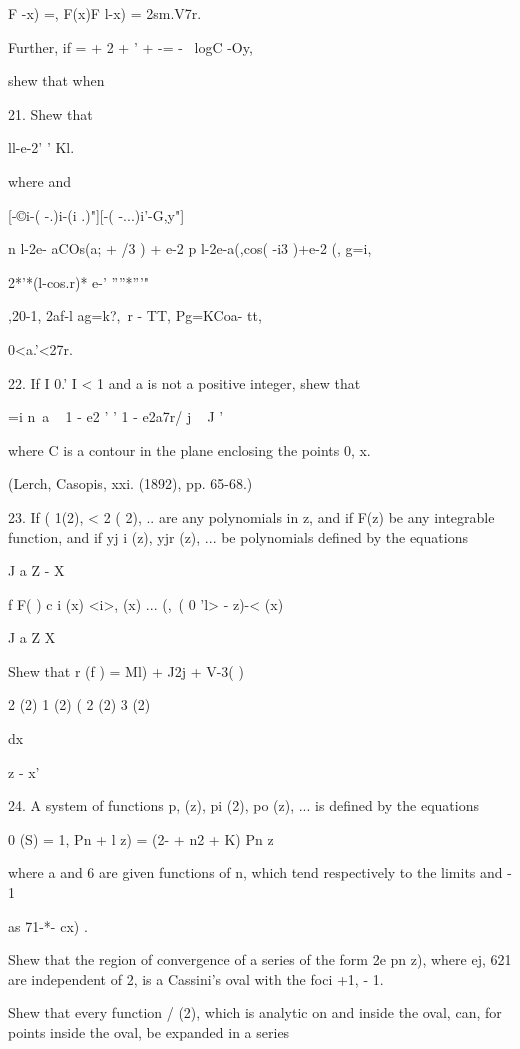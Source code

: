 {{{F -x) =, F(x)F l-x) = 2sm.V7r.

Further, if = + 2 + ' + -= - \ logC -Oy,

shew that when

21. Shew that

ll-e-2' ' Kl.


where and

[-©i-( -.)i-(i .)"][-( -...)i'-G,y"]

n l-2e- aCOs(a; + /3 ) + e-2 p l-2e-a(,cos( -i3 )+e-2 (, g=i,

2*'*(l-cos.r)* e-' ''''*'''"

,20-1, 2af-l ag=k?,\ r - TT, Pg=KCoa- tt,

0<a.'<27r.


%
%

22. If I 0.' I < 1 and a is not a positive integer, shew that

 =i n~a ~ 1 - e2 ' ' 1 - e2a7r/ j ~ J '

where C is a contour in the plane enclosing the points 0, x.

(Lerch, Casopis, xxi. (1892), pp. 65-68.)

23. If ( 1(2), < 2 ( 2), .. are any polynomials in z, and if F(z) be
any integrable function, and if yj i (z), yjr (z), ... be polynomials
defined by the equations

J a Z - X

f F( ) c i (x) <i>, (x) ... (,\, ( 0 'l> - z)-< (x)

J a Z X

Shew that r (f ) = Ml) + J2j + V-3( )

2 (2) 1 (2) ( 2 (2) 3 (2)

dx

z - x'

24. A system of functions p, (z), pi (2), po (z), ... is defined by
the equations

 0 (S) = 1, Pn + l z) = (2- + n2 + K) Pn z\

where a and 6 are given functions of n, which tend respectively to the
limits and - 1

as 71-*- cx) .

Shew that the region of convergence of a series of the form 2e pn z),
where ej, 621  are independent of 2, is a Cassini's oval with the
foci +1, - 1.

Shew that every function / (2), which is analytic on and inside the
oval, can, for points inside the oval, be expanded in a series

}}}
